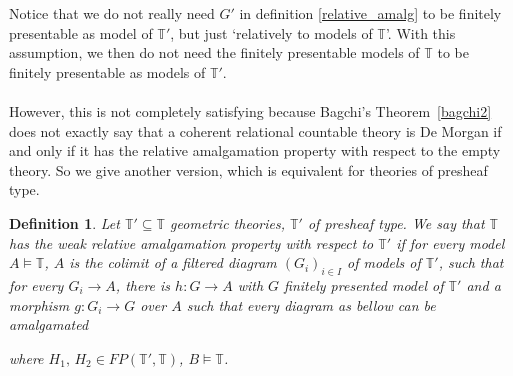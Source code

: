 \documentclass{article}
\newtheorem{definition}[theorem]{Definition}
\newcommand{\T}{\mathbb{T}}
\begin{document}
Notice that we do not really need $G'$ in definition \ref{relative_amalg} to be finitely presentable as model of $\T'$, but just `relatively to models of $\T$'. With this assumption, we then do not need the finitely presentable models of $\T$ to be finitely presentable as models of $\T'$.\\
\\
However, this is not completely satisfying because Bagchi's Theorem~\ref{bagchi2} does not exactly say that a coherent relational countable theory is De Morgan if and only if it has the relative amalgamation property with respect to the empty theory. So we give another version, which is equivalent for theories of presheaf type.

\begin{definition}
    Let $\T'\subseteq\T$ geometric theories, $\T'$ of presheaf type. We say that $\T$ has the weak relative amalgamation property with respect to $\T'$ if for every model $A\models\T$, $A$ is the colimit of a filtered diagram $(G_i)_{i\in I}$ of models of $\T'$, such that for every $G_i\xrightarrow{}A$, there is $h:G\xrightarrow{}A$ with $G$ finitely presented model  of $\T'$ and a morphism $g:G_i\xrightarrow{}G$ over $A$ such that every diagram as bellow can be amalgamated
    \begin{center}
    \end{center}
    where $H_1,\, H_2\in FP(\T',\T)$, $B\models\T$.
\end{definition}
\end{document}
